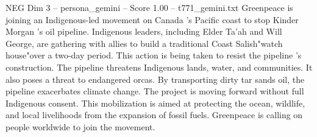 \begin{textsample}{NEG Dim 3 – persona\_gemini – Score 1.00 – t771\_gemini.txt}  \label{ex:f3_neg_019}
Greenpeace is joining an Indigenous-led movement on Canada 's Pacific coast to stop Kinder Morgan 's oil pipeline.
Indigenous leaders, including Elder Ta’ah and Will George, are gathering with allies to build a traditional Coast Salish"watch house"over a two-day period.
This action is being taken to resist the pipeline 's construction.
The pipeline threatens Indigenous lands, water, and communities.
It also poses a threat to endangered orcas.
By transporting dirty tar sands oil, the pipeline exacerbates climate change.
The project is moving forward without full Indigenous consent.
This mobilization is aimed at protecting the ocean, wildlife, and local livelihoods from the expansion of fossil fuels.
Greenpeace is calling on people worldwide to join the movement.

\end{textsample}
